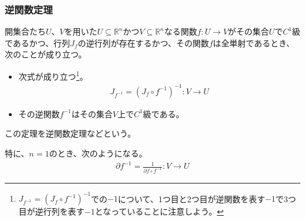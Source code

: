 \documentclass[dvipdfmx]{jsarticle}
\begin{document}
\subsubsection{逆関数定理}%
\begin{thm}[逆関数定理]\label{4.2.6.14}
開集合たち$U$、$V$を用いた$U \subseteq \mathbb{R}^{n}$かつ$V \subseteq \mathbb{R}^{n}$なる関数$f:U \rightarrow V$がその集合$UでC^{1}$級であるかつ、行列$J_{f} $の逆行列が存在するかつ、その関数$f$は全単射であるとき、次のことが成り立つ。
\begin{itemize}
\item
  次式が成り立つ\footnote{$J_{f^{- 1}} = \left( J_{f} \circ f^{- 1} \right)^{- 1}$での$- 1$について、1つ目と2つ目が逆関数を表す$- 1$で3つ目が逆行列を表す$- 1$となっていることに注意しよう。}。
\begin{align*}
J_{f^{- 1}} = \left( J_{f} \circ f^{- 1} \right)^{- 1}:V \rightarrow U
\end{align*}
\item
  その逆関数$f^{- 1}$はその集合$V$上で$C^{1}$級である。
\end{itemize}
この定理を逆関数定理などという。\par
特に、$n=1$のとき、次のようになる。
\begin{align*}
\partial f^{-1} =\frac{1}{\partial f \circ f^{-1} } : V\rightarrow U
\end{align*}
\end{thm}
\end{document}
